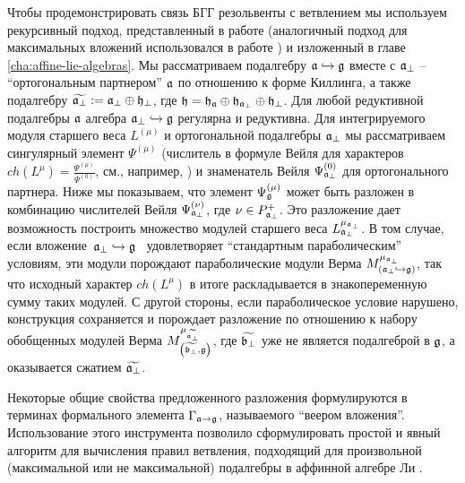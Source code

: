 Чтобы продемонстрировать связь БГГ резольвенты с ветвлением мы используем рекурсивный подход, представленный в работе \cite
{2010arXiv1007.0318L} (аналогичный подход для максимальных вложений использовался в работе \cite{ilyin812pbc}) и изложенный в главе \ref{cha:affine-lie-algebras}. Мы рассматриваем подалгебру $\mathfrak{a} \hookrightarrow \mathfrak{g}$ вместе с $\mathfrak{a}_{\perp}$ -- ``ортогональным партнером'' $\mathfrak{a}$ по отношению к форме Киллинга, а также подалгебру $\widetilde{\mathfrak{a}_{\perp}}:=\mathfrak{a}_{\perp}\oplus \frak{h}_{\perp }$, где $\frak{h}=\frak{\frak{h}_{\mathfrak{a}}}\oplus
\frak{h}_{\mathfrak{a}_{\perp}}\oplus \frak{h}_{\perp }$. Для любой редуктивной подалгебры $\mathfrak{a}$ алгебра $\mathfrak{a}_{\perp}\hookrightarrow \mathfrak{g}$ регулярна и редуктивна. Для интегрируемого модуля старшего веса $%
L^{\left(\mu \right) }$ и ортогональной подалгебры  $\mathfrak{a}_{\bot }$ мы рассматриваем сингулярный элемент $\Psi ^{\left( \mu \right) }$ (числитель в формуле Вейля для характеров $ch\left( L^{\mu }\right) =\frac{\Psi ^{\left(
\mu \right) }}{\Psi ^{\left( 0\right) }}$, см., например,  \cite
{humphreys1997introduction}) и знаменатель Вейля $\Psi _{\mathfrak{a}_{\bot
  }}^{\left( 0\right) }$ для ортогонального партнера. Ниже мы показываем, что элемент  $\Psi _{\gf%
}^{\left( \mu \right) }$ может быть разложен в комбинацию числителей Вейля $\Psi _{\mathfrak{a}_{\bot }}^{\left( \nu \right) }$, где $\nu \in P_{%
\mathfrak{a}_{\bot}}^{+}$. Это разложение дает возможность построить множество модулей старшего веса $L_{\afb}%
^{\mu _{\afb}}$. В том случае, если вложение\ $\af%
_{\bot }\hookrightarrow \gf$ \ удовлетворяет ``стандартным параболическим'' условиям, эти модули порождают параболические модули Верма $M_{\left(
\afb \hookrightarrow \gf\right) }^{\mu _{%
\afb}}$, так что исходный характер $ch\left(
L^{\mu }\right) $ в итоге раскладывается в знакопеременную сумму таких модулей. С другой стороны, если параболическое условие нарушено, конструкция сохраняется и порождает разложение по отношению к набору обобщенных модулей Верма  $M_{\left( \widetilde{\frak{b}_{\perp }},\gf\right) }^{\mu _{%
\widetilde{\afb}}}$, где $%
\widetilde{\frak{b}_{\perp }}$ уже не является подалгеброй в $\mathfrak{g}$, а оказывается сжатием $\widetilde{\mathfrak{a}_{\perp}}$.

Некоторые общие свойства предложенного разложения формулируются в терминах  формального элемента $\Gamma _{\mathfrak{a}\rightarrow \mathfrak{g}}$, называемого ``веером вложения''. Использование этого инструмента позволило сформулировать простой и явный алгоритм для вычисления правил ветвления, подходящий для произвольной (максимальной или не максимальной) подалгебры в аффинной алгебре Ли \cite{2010arXiv1007.0318L}.

